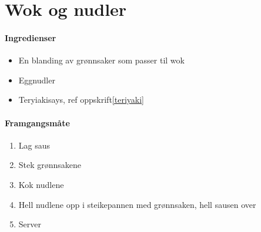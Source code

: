 \section{Wok og nudler}
\label{wok}


\paragraph{Ingredienser}
\begin{itemize}[noitemsep]
	\item En blanding av grønnsaker som passer til wok
	\item Eggnudler
	\item Teryiakisays, ref oppskrift\ref{teriyaki}
\end{itemize}

\paragraph{Framgangsmåte}
\begin{enumerate}[noitemsep]
	\item Lag saus
	\item Stek grønnsakene
	\item Kok nudlene
	\item Hell nudlene opp i steikepannen med grønnsaken, hell sausen over
	\item Server
\end{enumerate}
